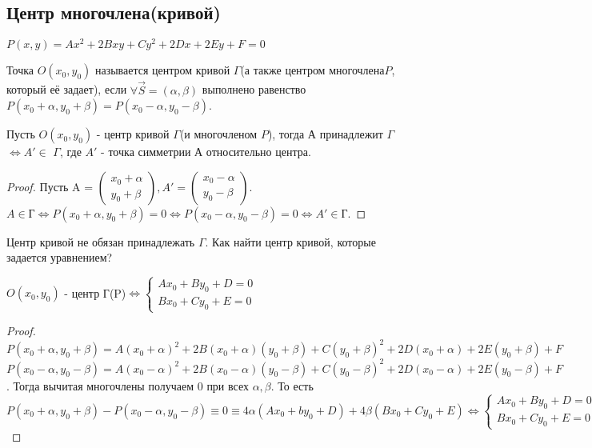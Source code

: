 \subsection{Центр многочлена(кривой)} 
\(P(x,y) = Ax^2+2Bxy+Cy^2+2Dx+2Ey+F=0\)
\begin{definition}
	Точка \(O(x_0, y_0)\) называется центром кривой $\Gamma$(а также центром многочлена$ P$, который её задает), если \(\forall \vec S = (\alpha, \beta)\) выполнено равенство 
	\(P(x_0+\alpha,y_0+\beta) = P(x_0-\alpha, y_0 - \beta)\).
\end{definition}
\begin{proposition}
	Пусть \(O(x_0, y_0)\) - центр кривой $\Gamma$(и многочленом $P$), тогда $А$ принадлежит $\Gamma$ $\Longleftrightarrow A'\in$ $\Gamma$, где $A'$ - точка симметрии А относительно центра.
\end{proposition}
\begin{proof}
	Пусть A = \(\begin{pmatrix}
		x_0+\alpha \\ y_0 + \beta
	\end{pmatrix}, A' = \begin{pmatrix}
	x_0 -\alpha \\ y_0-\beta
	\end{pmatrix}\). \(A\in \text{Г}\Longleftrightarrow P(x_0+\alpha, y_0+\beta)=0\Longleftrightarrow P(x_0-\alpha, y_0-\beta)=0\Longleftrightarrow A'\in\text{Г}\).
\end{proof}
\begin{note}
	Центр кривой не обязан принадлежать $\Gamma$. Как найти центр кривой, которые задается уравнением?
\end{note}
\begin{proposition}
	\(O(x_0, y_0)\) - центр Г(P)\(\Longleftrightarrow\left\{\begin{gathered}
		Ax_0 + By_0+D =0 \\
		Bx_0+Cy_0+E=0
	\end{gathered}\right.\)
\end{proposition}
\begin{proof}
	\(P(x_0+\alpha, y_0+\beta) = A(x_0+\alpha)^2+2B(x_0+\alpha)(y_0+\beta)+C(y_0+\beta)^2+2D(x_0+\alpha)+2E(y_0+\beta)+F\) \newline
	\(
	P(x_0-\alpha, y_0-\beta) = A(x_0-\alpha)^2+2B(x_0-\alpha)(y_0-\beta)+C(y_0-\beta)^2+2D(x_0-\alpha)+2E(y_0-\beta)+F
	\). Тогда вычитая многочлены получаем 0 при всех \(\alpha, \beta\). То есть \(P(x_0+\alpha, y_0+\beta)-P(x_0-\alpha, y_0-\beta) \equiv 0 \equiv 4\alpha(Ax_0+by_0+D)+4\beta(Bx_0+Cy_0+E)\Longleftrightarrow\left\{\begin{gathered}
		Ax_0+By_0+D = 0 \\
		Bx_0+Cy_0+E = 0
	\end{gathered}\right.\) 
\end{proof}
